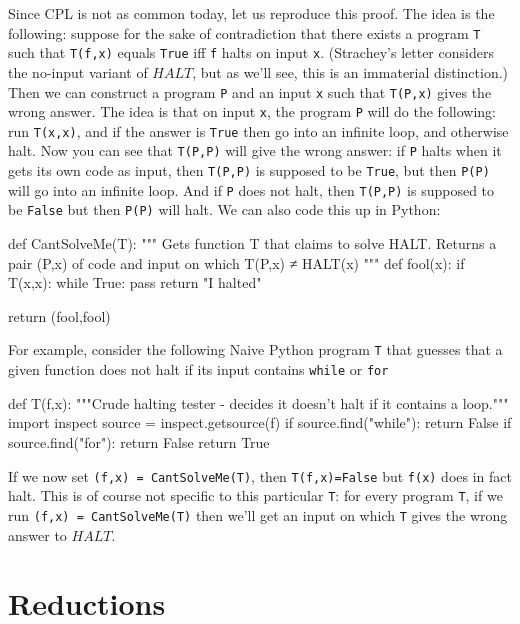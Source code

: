 Since CPL is not as common today, let us reproduce this proof. The idea
is the following: suppose for the sake of contradiction that there
exists a program \texttt{T} such that \texttt{T(f,x)} equals
\texttt{True} iff \texttt{f} halts on input \texttt{x}. (Strachey's
letter considers the no-input variant of \(\ensuremath{\mathit{HALT}}\),
but as we'll see, this is an immaterial distinction.) Then we can
construct a program \texttt{P} and an input \texttt{x} such that
\texttt{T(P,x)} gives the wrong answer. The idea is that on input
\texttt{x}, the program \texttt{P} will do the following: run
\texttt{T(x,x)}, and if the answer is \texttt{True} then go into an
infinite loop, and otherwise halt. Now you can see that \texttt{T(P,P)}
will give the wrong answer: if \texttt{P} halts when it gets its own
code as input, then \texttt{T(P,P)} is supposed to be \texttt{True}, but
then \texttt{P(P)} will go into an infinite loop. And if \texttt{P} does
not halt, then \texttt{T(P,P)} is supposed to be \texttt{False} but then
\texttt{P(P)} will halt. We can also code this up in Python:

\begin{code}
def CantSolveMe(T):
    """
    Gets function T that claims to solve HALT.
    Returns a pair (P,x) of code and input on which
    T(P,x) ≠ HALT(x)
    """
    def fool(x):
        if T(x,x):
            while True: pass
        return "I halted"

    return (fool,fool)
\end{code}

For example, consider the following Naive Python program \texttt{T} that
guesses that a given function does not halt if its input contains
\texttt{while} or \texttt{for}

\begin{code}
def T(f,x):
    """Crude halting tester - decides it doesn't halt if it contains a loop."""
    import inspect
    source = inspect.getsource(f)
    if source.find("while"): return False
    if source.find("for"): return False
    return True
\end{code}

If we now set \texttt{(f,x) = CantSolveMe(T)}, then
\texttt{T(f,x)=False} but \texttt{f(x)} does in fact halt. This is of
course not specific to this particular \texttt{T}: for every program
\texttt{T}, if we run \texttt{(f,x) = CantSolveMe(T)} then we'll get an
input on which \texttt{T} gives the wrong answer to
\(\ensuremath{\mathit{HALT}}\).

\section{Reductions}\label{reductionsuncompsec}

